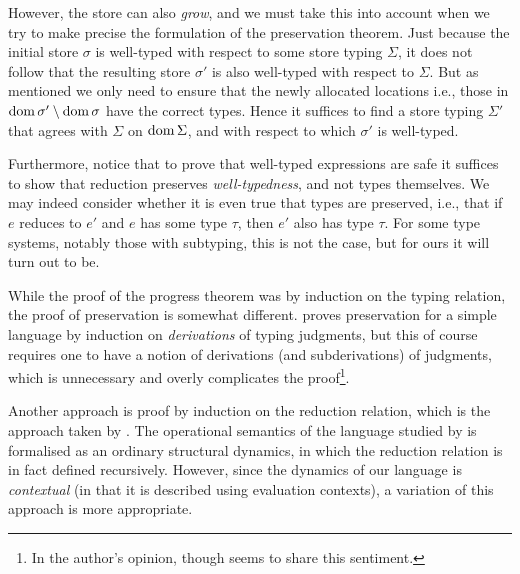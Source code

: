 However, the store can also \emph{grow}, and we must take this into account when we try to make precise the formulation of the preservation theorem. Just because the initial store $\sigma$ is well-typed with respect to some store typing $\Sigma$, it does not follow that the resulting store $\sigma'$ is also well-typed with respect to $\Sigma$. But as mentioned we only need to ensure that the newly allocated locations \textdash i.e., those in $\operatorname{dom}{\sigma'} \setminus \operatorname{dom}{\sigma}$ \textdash have the correct types. Hence it suffices to find a store typing $\Sigma'$ that agrees with $\Sigma$ on $\operatorname{dom}{\Sigma}$, and with respect to which $\sigma'$ is well-typed.

Furthermore, notice that to prove that well-typed expressions are safe it suffices to show that reduction preserves \emph{well-typedness}, and not types themselves. We may indeed consider whether it is even true that types are preserved, i.e., that if $e$ reduces to $e'$ and $e$ has some type $\tau$, then $e'$ also has type $\tau$. For some type systems, notably those with subtyping, this is not the case, but for ours it will turn out to be.

While the proof of the progress theorem was by induction on the typing relation, the proof of preservation is somewhat different. \Textcite[Theorem~8.3.3]{pierce-types} proves preservation for a simple language by induction on \emph{derivations} of typing judgments, but this of course requires one to have a notion of derivations (and subderivations) of judgments, which is unnecessary and overly complicates the proof\footnote{In the author's opinion, though \textcite[§6.1]{harper-pl} seems to share this sentiment.}.

Another approach is proof by induction on the reduction relation, which is the approach taken by \textcite[Theorem~6.2]{harper-pl}. The operational semantics of the language studied by \citeauthor{harper-pl} is formalised as an ordinary structural dynamics, in which the reduction relation is in fact defined recursively. However, since the dynamics of our language is \emph{contextual} (in that it is described using evaluation contexts), a variation of this approach is more appropriate.

